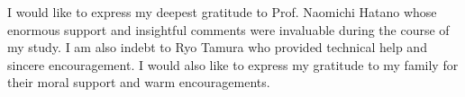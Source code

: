 I would like to express my deepest gratitude to Prof. Naomichi Hatano whose enormous support and insightful comments were invaluable during the course of my study. I am also indebt to Ryo Tamura who provided technical help and sincere encouragement. I would also like to express my gratitude to my family for their moral support and warm encouragements.